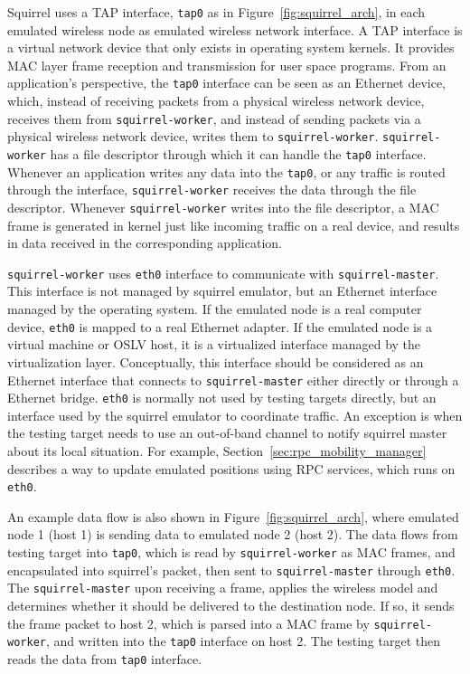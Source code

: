 \documentclass[12pt]{report}
\begin{document}
Squirrel uses a TAP\cite{tuntap2002} interface, \texttt{tap0} as in Figure~\ref{fig:squirrel_arch}, in each emulated wireless node as emulated wireless network interface. A TAP interface is a virtual network device that only exists in operating system kernels. It provides MAC layer frame reception and transmission for user space programs. From an application's perspective, the \texttt{tap0} interface can be seen as an Ethernet device, which, instead of receiving packets from a physical wireless network device, receives them from \texttt{squirrel-worker}, and instead of sending packets via a physical wireless network device, writes them to \texttt{squirrel-worker}. \texttt{squirrel-worker} has a file descriptor through which it can handle the \texttt{tap0} interface. Whenever an application writes any data into the \texttt{tap0}, or any traffic is routed through the interface, \texttt{squirrel-worker} receives the data through the file descriptor. Whenever \texttt{squirrel-worker} writes into the file descriptor, a MAC frame is generated in kernel just like incoming traffic on a real device, and results in data received in the corresponding application.

\texttt{squirrel-worker} uses \texttt{eth0} interface to communicate with \texttt{squirrel-master}. This interface is not managed by squirrel emulator, but an Ethernet interface managed by the operating system. If the emulated node is a real computer device, \texttt{eth0} is mapped to a real Ethernet adapter. If the emulated node is a virtual machine or OSLV host, it is a virtualized interface managed by the virtualization layer. Conceptually, this interface should be considered as an Ethernet interface that connects to \texttt{squirrel-master} either directly or through a Ethernet bridge. \texttt{eth0} is normally not used by testing targets directly, but an interface used by the squirrel emulator to coordinate traffic. An exception is when the testing target needs to use an out-of-band channel to notify squirrel master about its local situation. For example, Section~\ref{sec:rpc_mobility_manager} describes a way to update emulated positions using RPC services, which runs on \texttt{eth0}.

An example data flow is also shown in Figure~\ref{fig:squirrel_arch}, where emulated node 1 (host 1) is sending data to emulated node 2 (host 2). The data flows from testing target into \texttt{tap0}, which is read by \texttt{squirrel-worker} as MAC frames, and encapsulated into squirrel's packet, then sent to \texttt{squirrel-master} through \texttt{eth0}. The \texttt{squirrel-master} upon receiving a frame, applies the wireless model and determines whether it should be delivered to the destination node. If so, it sends the frame packet to host 2, which is parsed into a MAC frame by \texttt{squirrel-worker}, and written into the \texttt{tap0} interface on host 2. The testing target then reads the data from \texttt{tap0} interface.
\end{document}
